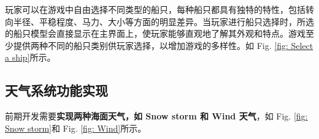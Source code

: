 \documentclass[a4paper,10pt]{article}
\begin{document}
		玩家可以在游戏中自由选择不同类型的船只，每种船只都具有独特的特性，包括转向半径、平稳程度、马力、大小等方面的明显差异。当玩家进行船只选择时，所选的船只模型会直接显示在主界面上，使玩家能够直观地了解其外观和特点。游戏至少提供两种不同的船只类别供玩家选择，以增加游戏的多样性。如 Fig. \ref{fig: Select a ship}所示。
	
		\subsection{天气系统功能实现}
	
		前期开发需要\textbf{实现两种海面天气，如 Snow storm 和 Wind 天气}，如 Fig. \ref{fig: Snow storm}和 Fig. \ref{fig: Wind}所示。
		
		\begin{figure}[htbp] 
			\centering 
			

\end{figure}
\end{document}
